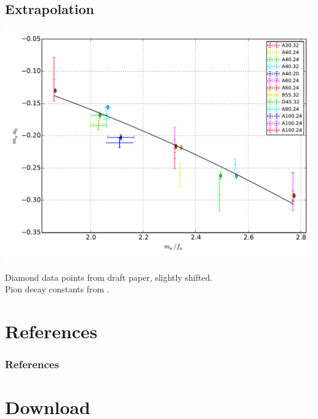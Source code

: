 \documentclass[english, fleqn]{beamer}
\begin{document}
\subsection*{Extrapolation}

\begin{frame}
    \begin{center}
        \includegraphics[height=.85\textheight]{plots/result.pdf}
    \end{center}

    Diamond data points from draft paper, slightly shifted. \\
    Pion decay constants from
    \parencite[table~1]{Knippschild/Pi_Pi_Scattering}.
\end{frame}


\section*{References}

\begin{frame}
    \frametitle{References}

    \printbibliography
\end{frame}

\section*{Download}
\end{document}
